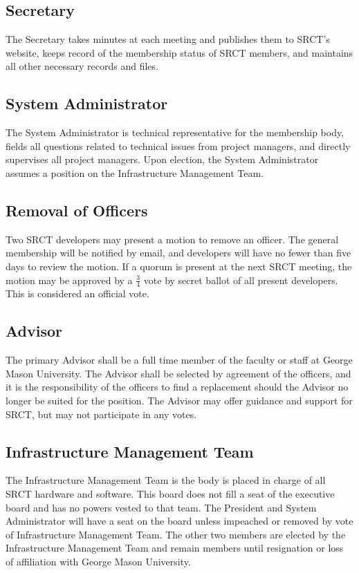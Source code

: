 \documentclass{article}
\begin{document}
  \subsection{Secretary}
  The Secretary takes minutes at each meeting and publishes them to 
  SRCT's website, keeps record of the membership status of SRCT members, 
  and maintains all other necessary records and files.
  
  \subsection{System Administrator}
  The System Administrator is technical representative for the membership body,  
  fields all questions related to technical issues from project managers, and 
  directly supervises all project managers. Upon election, the System Administrator
  assumes a position on the Infrastructure Management Team.

  \subsection{Removal of Officers}
  Two SRCT developers may present a motion to remove an officer. The general
  membership will be notified by email, and developers will have no fewer
  than five days to review the motion. If a quorum is present at the next
  SRCT meeting, the motion may be approved by a $\frac{3}{4}$ vote by secret 
  ballot of all present developers. This is considered an official vote.
  
  \subsection{Advisor}
  The primary Advisor shall be a full time member of the faculty or staff at 
  George Mason University. The Advisor shall be selected by agreement of 
  the officers, and it is the responsibility of the officers to find a
  replacement should the Advisor no longer be suited for the position.
  The Advisor may offer guidance and support for SRCT, but may not 
  participate in any votes.
 
  \subsection{Infrastructure Management Team}
  The Infrastructure Management Team is the body is placed in charge of all
  SRCT hardware and software. This board does not fill a seat of the 
  executive board and has no powers vested to that team. The President and
  System Administrator will have a seat on the board unless impeached or 
  removed by vote of Infrastructure Management Team. The other two members 
  are elected by the Infrastructure Management Team and remain members 
  until resignation or loss of affiliation with George Mason University. 
\end{document}

